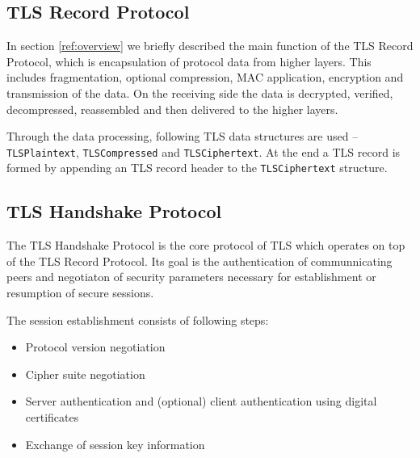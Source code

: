 \subsection{TLS Record Protocol}
    In section \ref{ref:overview} we briefly described the main function of the
    TLS Record Protocol, which is encapsulation of protocol data from higher
    layers. This includes fragmentation, optional compression, MAC application,
    encryption and transmission of the data. On the receiving side the data is
    decrypted, verified, decompressed, reassembled and then delivered to the
    higher layers.

    Through the data processing, following TLS data structures are used --
    \texttt{TLSPlaintext}, \texttt{TLSCompressed} and \texttt{TLSCiphertext}.
    At the end a TLS record is formed by appending an TLS record header to
    the \texttt{TLSCiphertext} structure.

\subsection{TLS Handshake Protocol} \label{ref:tls_handshake_protocol}
    The TLS Handshake Protocol is the core protocol of TLS which operates on
    top of the TLS Record Protocol. Its goal is the authentication of communnicating
    peers and negotiaton of security parameters necessary for establishment or
    resumption of secure sessions.


    \noindent The session establishment consists of following steps:
    \begin{itemize}
        \item Protocol version negotiation
        \item Cipher suite negotiation
        \item Server authentication and (optional) client authentication using
              digital certificates
        \item Exchange of session key information
    \end{itemize}

